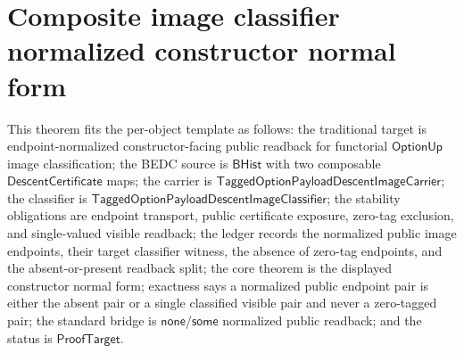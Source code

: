 \section{Composite image classifier normalized constructor normal form}
\label{sec:option-composite-image-classifier-normalized-constructor-normal-form}

\begin{theorem}
\label{thm:tagged-option-composite-image-classifier-normalized-constructor-normal-form}
This theorem fits the per-object template as follows: the traditional target is
endpoint-normalized constructor-facing public readback for functorial
$\mathsf{OptionUp}$ image classification; the BEDC source is $\mathsf{BHist}$
with two composable $\mathsf{DescentCertificate}$ maps; the carrier is
$\mathsf{TaggedOptionPayloadDescentImageCarrier}$; the classifier is
$\mathsf{TaggedOptionPayloadDescentImageClassifier}$; the stability obligations
are endpoint transport, public certificate exposure, zero-tag exclusion, and
single-valued visible readback; the ledger records the normalized public image
endpoints, their target classifier witness, the absence of zero-tag endpoints,
and the absent-or-present readback split; the core theorem is the displayed
constructor normal form; exactness says a normalized public endpoint pair is
either the absent pair or a single classified visible pair and never a
zero-tagged pair; the standard bridge is $\mathsf{none}$/$\mathsf{some}$
normalized public readback; and the status is $\mathsf{ProofTarget}$.


\end{theorem}
